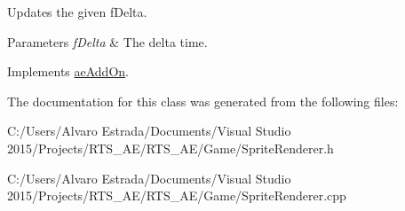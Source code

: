 Updates the given f\+Delta. 


\begin{DoxyParams}{Parameters}
{\em f\+Delta} & The delta time. \\
\hline
\end{DoxyParams}


Implements \hyperlink{classae_add_on_a51caa4b8680206495ea671e71991e231}{ae\+Add\+On}.



The documentation for this class was generated from the following files\+:\begin{DoxyCompactItemize}
\item 
C\+:/\+Users/\+Alvaro Estrada/\+Documents/\+Visual Studio 2015/\+Projects/\+R\+T\+S\+\_\+\+A\+E/\+R\+T\+S\+\_\+\+A\+E/\+Game/Sprite\+Renderer.\+h\item 
C\+:/\+Users/\+Alvaro Estrada/\+Documents/\+Visual Studio 2015/\+Projects/\+R\+T\+S\+\_\+\+A\+E/\+R\+T\+S\+\_\+\+A\+E/\+Game/Sprite\+Renderer.\+cpp\end{DoxyCompactItemize}
